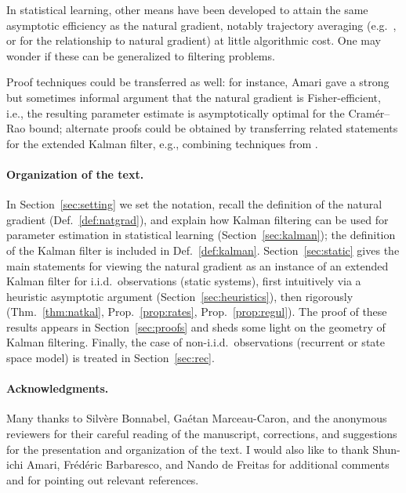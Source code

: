 \documentclass[11pt,a4paper]{article}
\newcommand{\1}{\mathbbm{1}}
\theoremstyle{yannthm}
\theoremstyle{yannthm2}
\numberwithin{equation}{section}
\begin{document}
In statistical learning, other means have been developed to attain the
same asymptotic efficiency as the natural gradient, notably trajectory
averaging (e.g.~\cite{polyakjuditsky1992}, or \cite{martensnatgrad} for
the relationship to natural gradient) at little algorithmic cost. One may
wonder if these can be generalized to filtering problems.

Proof techniques could be transferred as well: for instance, Amari \cite{Amari1998}
gave a strong but sometimes informal argument that the natural gradient
is Fisher-efficient, i.e., the resulting parameter estimate is asymptotically optimal for the Cramér--Rao
bound; alternate proofs could be obtained by transferring related
statements for the extended Kalman filter, e.g., combining techniques
from \cite{simandl2001CramerRao,boutayeb1997EKFconv,ljung83}.

\paragraph*{Organization of the text.} In Section~\ref{sec:setting} we
set the notation, recall the definition of the natural gradient
(Def.~\ref{def:natgrad}), and explain how Kalman filtering can be used for
parameter estimation in statistical learning (Section~\ref{sec:kalman}); the definition of the
Kalman filter is included in Def.~\ref{def:kalman}.
Section~\ref{sec:static} gives the main statements for viewing the
natural gradient as an instance of an extended Kalman filter for i.i.d.\ 
observations (static systems), first intuitively via a heuristic
asymptotic argument (Section~\ref{sec:heuristics}), then rigorously
(Thm.~\ref{thm:natkal}, Prop.~\ref{prop:rates}, Prop.~\ref{prop:regul}).
The proof of these results appears in Section~\ref{sec:proofs} and sheds
some light on the geometry of Kalman filtering. Finally, the case of
non-i.i.d.\ observations (recurrent or state space model) is treated in
Section~\ref{sec:rec}.

\paragraph*{Acknowledgments.} Many thanks to Silvère Bonnabel, Gaétan
Marceau-Caron, and the anonymous reviewers for their careful reading of
the manuscript, corrections, and suggestions for the presentation and
organization of the text.  I would also like to thank Shun-ichi Amari,
Frédéric Barbaresco, and Nando de Freitas for additional comments and for
pointing out relevant references.
\end{document}

